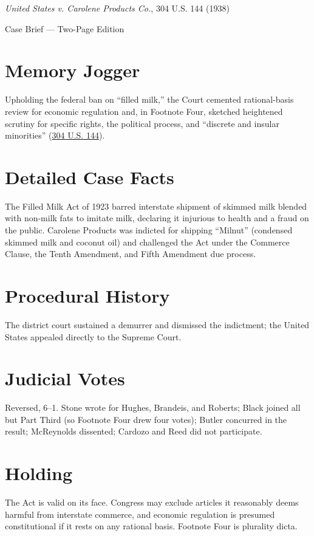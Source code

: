 \documentclass[12pt]{article}
\begin{document}
\begin{center}
{\LARGE \textit{United States v. Carolene Products Co.}, 304 U.S. 144 (1938)\par}
\vspace{0.5em}
{\large Case Brief --- Two-Page Edition\par}
\end{center}

\section{Memory Jogger}
Upholding the federal ban on ``filled milk,'' the Court cemented rational-basis review for economic regulation and, in Footnote Four, sketched heightened scrutiny for specific rights, the political process, and ``discrete and insular minorities'' (\href{https://supreme.justia.com/cases/federal/us/304/144/}{304 U.S. 144}).

\section{Detailed Case Facts}
The Filled Milk Act of 1923 barred interstate shipment of skimmed milk blended with non-milk fats to imitate milk, declaring it injurious to health and a fraud on the public. Carolene Products was indicted for shipping ``Milnut'' (condensed skimmed milk and coconut oil) and challenged the Act under the Commerce Clause, the Tenth Amendment, and Fifth Amendment due process.

\section{Procedural History}
The district court sustained a demurrer and dismissed the indictment; the United States appealed directly to the Supreme Court.

\section{Judicial Votes}
Reversed, 6--1. Stone wrote for Hughes, Brandeis, and Roberts; Black joined all but Part Third (so Footnote Four drew four votes); Butler concurred in the result; McReynolds dissented; Cardozo and Reed did not participate.

\section{Holding}
The Act is valid on its face. Congress may exclude articles it reasonably deems harmful from interstate commerce, and economic regulation is presumed constitutional if it rests on any rational basis. Footnote Four is plurality dicta.
\end{document}
